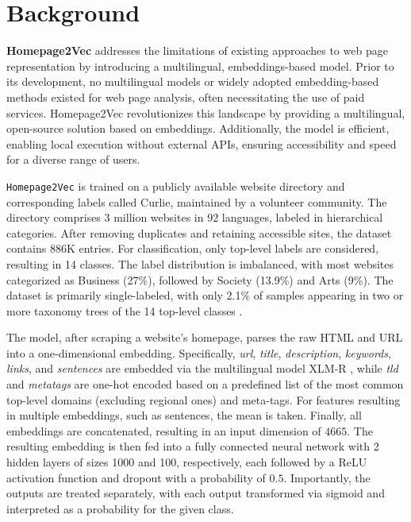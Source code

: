 \section{Background}\label{sec:background}

\textbf{Homepage2Vec} addresses the limitations of existing approaches to web page representation by introducing a multilingual, embeddings-based model. Prior to its development, no multilingual models or widely adopted embedding-based methods existed for web page analysis, often necessitating the use of paid services. Homepage2Vec revolutionizes this landscape by providing a multilingual, open-source solution based on embeddings. Additionally, the model is efficient, enabling local execution without external APIs, ensuring accessibility and speed for a diverse range of users.

\texttt{Homepage2Vec} is trained on a publicly available website directory and corresponding labels called Curlie, maintained by a volunteer community. The directory comprises 3 million websites in 92 languages, labeled in hierarchical categories. After removing duplicates and retaining accessible sites, the dataset contains 886K entries. For classification, only top-level labels are considered, resulting in 14 classes.  The label distribution is imbalanced, with most websites categorized as Business (27\%), followed by Society (13.9\%) and Arts (9\%). The dataset is primarily single-labeled, with only 2.1\% of samples appearing in two or more taxonomy trees of the 14 top-level classes \cite{homepage2vec}.

The model, after scraping a website's homepage, parses the raw HTML and URL into a one-dimensional embedding. Specifically, \textit{url}, \textit{title}, \textit{description}, \textit{keywords}, \textit{links}, and \textit{sentences} are embedded via the multilingual model XLM-R \cite{xmlr}, while \textit{tld} and \textit{metatags} are one-hot encoded based on a predefined list of the most common top-level domains (excluding regional ones) and meta-tags. For features resulting in multiple embeddings, such as sentences, the mean is taken. Finally, all embeddings are concatenated, resulting in an input dimension of $4665$. The resulting embedding is then fed into a fully connected neural network with 2 hidden layers of sizes 1000 and 100, respectively, each followed by a ReLU activation function and dropout with a probability of $0.5$. Importantly, the outputs are treated separately, with each output transformed via sigmoid and interpreted as a probability for the given class.

